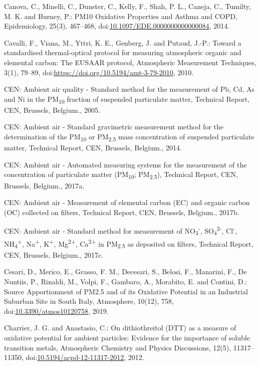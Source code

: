 \documentclass[
]{article}
\begin{document}
Canova, C., Minelli, C., Dunster, C., Kelly, F., Shah, P. L., Caneja,
C., Tumilty, M. K. and Burney, P.: PM10 Oxidative Properties and Asthma
and COPD, Epidemiology, 25(3), 467--468,
doi:\href{https://doi.org/10.1097/EDE.0000000000000084}{10.1097/EDE.0000000000000084},
2014.

Cavalli, F., Viana, M., Yttri, K. E., Genberg, J. and Putaud, J.-P.:
Toward a standardised thermal-optical protocol for measuring atmospheric
organic and elemental carbon: The EUSAAR protocol, Atmospheric
Measurement Techniques, 3(1), 79--89,
doi:\href{https://doi.org/https://doi.org/10.5194/amt-3-79-2010}{https://doi.org/10.5194/amt-3-79-2010},
2010.

CEN: Ambient air quality - Standard method for the measurement of Pb,
Cd, As and Ni in the PM\textsubscript{10} fraction of suspended
particulate matter, Technical Report, CEN, Brussels, Belgium., 2005.

CEN: Ambient air - Standard gravimetric measurement method for the
determination of the PM\textsubscript{10} or PM\textsubscript{2.5} mass
concentration of suspended particulate matter, Technical Report, CEN,
Brussels, Belgium., 2014.

CEN: Ambient air - Automated measuring systems for the measurement of
the concentration of particulate matter (PM\textsubscript{10};
PM\textsubscript{2.5}), Technical Report, CEN, Brussels, Belgium.,
2017a.

CEN: Ambient air - Measurement of elemental carbon (EC) and organic
carbon (OC) collected on filters, Technical Report, CEN, Brussels,
Belgium., 2017b.

CEN: Ambient air - Standard method for measurement of
NO\textsubscript{3}\textsuperscript{-},
SO\textsubscript{4}\textsuperscript{2-}, Cl\textsuperscript{-},
NH\textsubscript{4}\textsuperscript{+}, Na\textsuperscript{+},
K\textsuperscript{+}, Mg\textsuperscript{2+}, Ca\textsuperscript{2+} in
PM\textsubscript{2.5} as deposited on filters, Technical Report, CEN,
Brussels, Belgium., 2017c.

Cesari, D., Merico, E., Grasso, F. M., Decesari, S., Belosi, F.,
Manarini, F., De Nuntiis, P., Rinaldi, M., Volpi, F., Gambaro, A.,
Morabito, E. and Contini, D.: Source Apportionment of PM2.5 and of its
Oxidative Potential in an Industrial Suburban Site in South Italy,
Atmosphere, 10(12), 758,
doi:\href{https://doi.org/10.3390/atmos10120758}{10.3390/atmos10120758},
2019.

Charrier, J. G. and Anastasio, C.: On dithiothreitol (DTT) as a measure
of oxidative potential for ambient particles: Evidence for the
importance of soluble transition metals, Atmospheric Chemistry and
Physics Discussions, 12(5), 11317--11350,
doi:\href{https://doi.org/10.5194/acpd-12-11317-2012}{10.5194/acpd-12-11317-2012},
2012.
\end{document}
